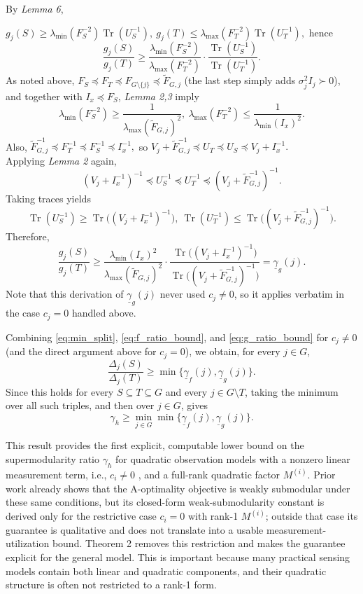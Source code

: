 \documentclass[letterpaper, 10 pt, conference]{ieeeconf}  %
\begin{document}
\noindent By \textit{Lemma 6},

$g_j(S)
\ge
\lambda_{\min}(F_S^{-2})\operatorname{Tr}(U_S^{-1}),
\
g_j(T)
\le
\lambda_{\max}(F_T^{-2})\operatorname{Tr}(U_T^{-1}),
$
hence
\[
\frac{g_j(S)}{g_j(T)}
\ge
\frac{\lambda_{\min}(F_S^{-2})}{\lambda_{\max}(F_T^{-2})}
\cdot
\frac{\operatorname{Tr}(U_S^{-1})}{\operatorname{Tr}(U_T^{-1})}.
\]
As noted above, \(F_S\preceq F_T\preceq F_{G\setminus\{j\}}\preceq \widetilde F_{G,j}\) (the last step simply adds \(\sigma_j^2 I_j\succ 0\)), and together with \(I_x\preceq F_S\), \textit{Lemma 2,3} imply
\[
\lambda_{\min}(F_S^{-2})
\ge
\frac{1}{\lambda_{\max}(\widetilde F_{G,j})^2},
\
\lambda_{\max}(F_T^{-2})
\le
\frac{1}{\lambda_{\min}(I_x)^2}.
\]
Also, $\widetilde F_{G,j}^{-1}\preceq F_T^{-1}\preceq F_S^{-1}\preceq I_x^{-1},$ so $V_j+\widetilde F_{G,j}^{-1}\preceq U_T\preceq U_S\preceq V_j+I_x^{-1}.$ \\

\noindent Applying \textit{Lemma 2} again,
\[
(V_j+I_x^{-1})^{-1}\preceq U_S^{-1}\preceq U_T^{-1}\preceq (V_j+\widetilde F_{G,j}^{-1})^{-1}.
\]
Taking traces yields
\[
\operatorname{Tr}(U_S^{-1})
\ge
\operatorname{Tr}\!\big((V_j+I_x^{-1})^{-1}\big),
\
\operatorname{Tr}(U_T^{-1})
\le
\operatorname{Tr}\!\big((V_j+\widetilde F_{G,j}^{-1})^{-1}\big).
\]
Therefore,
\begin{equation}
\label{eq:g_ratio_bound}
\frac{g_j(S)}{g_j(T)}
\ge \frac{\lambda_{\min}(I_x)^2}{\lambda_{\max}(\widetilde F_{G,j})^2}
\cdot
\frac{
\operatorname{Tr}\!\big((V_j+I_x^{-1})^{-1}\big)
}{
\operatorname{Tr}\!\big((V_j+\widetilde F_{G,j}^{-1})^{-1}\big)
} =
\underline\gamma_g(j).
\end{equation}
Note that this derivation of \(\underline\gamma_g(j)\) never used \(c_j\neq 0\), so it applies verbatim in the case \(c_j=0\) handled above.

\noindent Combining \eqref{eq:min_split}, \eqref{eq:f_ratio_bound}, and \eqref{eq:g_ratio_bound} for \(c_j\neq 0\) (and the direct argument above for \(c_j=0\)), we obtain, for every \(j\in G\),
\[
\frac{\Delta_j(S)}{\Delta_j(T)}
\ge
\min\{\underline\gamma_f(j),\underline\gamma_g(j)\}.
\]
Since this holds for every \(S\subseteq T\subseteq G\) and every \(j\in G\setminus T\), taking the minimum over all such triples, and then over \(j\in G\), gives
\[
\gamma_h\ge \min_{j\in G}\min\{\underline\gamma_f(j),\underline\gamma_g(j)\}.
\]

This result provides the first explicit, computable lower bound on the supermodularity ratio $\gamma_h$ for quadratic observation models with a nonzero linear measurement term, i.e.,
$c_i \neq 0$
, and a full-rank quadratic factor
$M^{(i)}$. Prior work \cite{c19} already shows that the A-optimality objective is weakly submodular under these same conditions, but its closed-form weak-submodularity constant is derived only for the restrictive case $c_i=0$ with rank-1 $M^{(i)}$; outside that case its guarantee is qualitative and does not translate into a usable measurement-utilization bound. Theorem 2 removes this restriction and makes the guarantee explicit for the general model. This is important because many practical sensing models contain both linear and quadratic components, and their quadratic structure is often not restricted to a rank-1 form.
\end{document}

